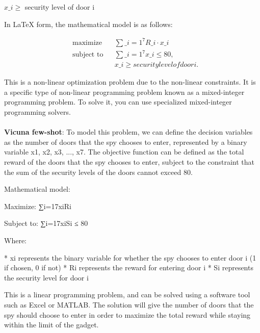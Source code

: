 \documentclass{article}%
\begin{document}
$x\_i \geq$ security level of door i

In LaTeX form, the mathematical model is as follows:

\[
\begin{aligned}
& \text{maximize} && \sum\_{i=1}^7 R\_i \cdot x\_i \\
& \text{subject to} && \sum\_{i=1}^7 x\_i \leq 80, \\
& && x\_i \geq security level of door i.
\end{aligned}
\]

This is a non-linear optimization problem due to the non-linear constraints. It is a specific type of non-linear programming problem known as a mixed-integer programming problem. To solve it, you can use specialized mixed-integer programming solvers.\\\\%
\textbf{Vicuna few-shot}: To model this problem, we can define the decision variables as the number of doors that the spy chooses to enter, represented by a binary variable x1, x2, x3, ..., x7. The objective function can be defined as the total reward of the doors that the spy chooses to enter, subject to the constraint that the sum of the security levels of the doors cannot exceed 80.

Mathematical model:

Maximize: ∑i=17xiRi

Subject to: ∑i=17xiSi ≤ 80

Where:

* xi represents the binary variable for whether the spy chooses to enter door i (1 if chosen, 0 if not)
* Ri represents the reward for entering door i
* Si represents the security level for door i

This is a linear programming problem, and can be solved using a software tool such as Excel or MATLAB. The solution will give the number of doors that the spy should choose to enter in order to maximize the total reward while staying within the limit of the gadget.\\\\%
\end{document}
